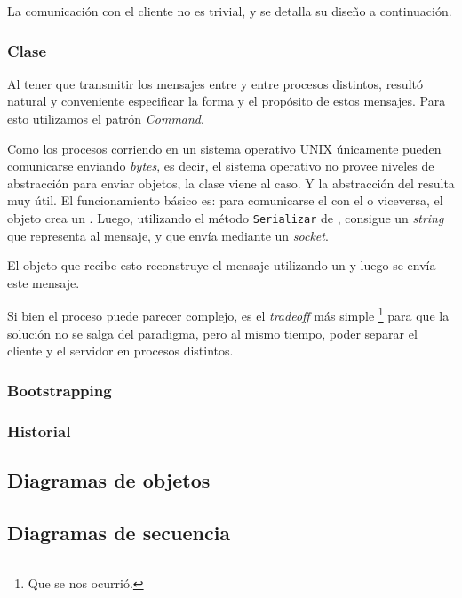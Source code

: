           La comunicaci\'on con el cliente no es trivial, y se detalla su dise\~no a
          continuaci\'on.

      \subsubsection{Clase \mensaje{}}
          Al tener que transmitir los mensajes entre \cliente{} y \servidor{} entre
          procesos distintos, result\'o natural y conveniente especificar la forma
          y el prop\'osito de estos mensajes.
          Para esto utilizamos el patr\'on \textit{Command}.
          
          Como los procesos corriendo en un sistema operativo \textsc{UNIX} \'unicamente
          pueden comunicarse enviando \textit{bytes}, es decir, el sistema operativo no
          provee niveles de abstracci\'on para enviar objetos, la clase
          \constructorMensaje{} viene al caso. Y la abstracci\'on del \mensaje{}
          resulta muy \'util.
          El funcionamiento b\'asico es: para comunicarse el \cliente{} con el \servidor{}
          o viceversa, el objeto crea un \mensaje{}.
          Luego, utilizando el m\'etodo \texttt{Serializar} de \mensaje{}, consigue un
          \textit{string} que representa al mensaje, y que env\'ia mediante un \textit{socket}.

          El objeto que recibe esto reconstruye el mensaje utilizando un \constructorMensaje{}
          y luego se env\'ia este mensaje.

          Si bien el proceso puede parecer complejo, es el \textit{tradeoff} m\'as simple
          \footnote{Que se nos ocurri\'o.} para que la soluci\'on no se salga del paradigma,
          pero al mismo tiempo, poder separar el cliente y el servidor en procesos distintos.

      \subsubsection{Bootstrapping}

      \subsubsection{Historial}

  \subsection{Diagramas de objetos}

  \subsection{Diagramas de secuencia}
